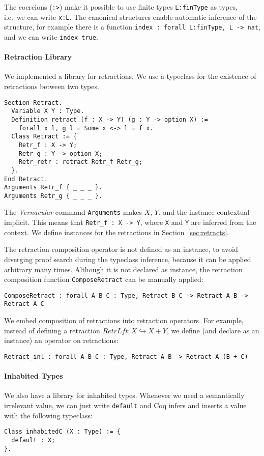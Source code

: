 The coercions (\lstinline!:>!) make it possible to use finite types \lstinline{L:finType} as types, i.e.\ we can write \lstinline!x:L!.  The canonical
structures enable automatic inference of the structure, for example there is a function \lstinline!index : forall L:finType, L -> nat!, and we can
write \lstinline!index true!.

\paragraph{Retraction Library}

We implemented a library for retractions.  We use a typeclass for the existence of retractions between two types.
\begin{lstlisting}
Section Retract.
  Variable X Y : Type.
  Definition retract (f : X -> Y) (g : Y -> option X) :=
    forall x l, g l = Some x <-> l = f x.
  Class Retract := {
    Retr_f : X -> Y;
    Retr_g : Y -> option X;
    Retr_retr : retract Retr_f Retr_g;
  }.
End Retract.
Arguments Retr_f { _ _ _ }.
Arguments Retr_g { _ _ _ }.
\end{lstlisting}
The \textit{Vernacular} command \lstinline!Arguments! makes $X$, $Y$, and the instance contextual implicit.  This means that
\lstinline!Retr_f : X -> Y!, where \lstinline!X! and \lstinline!Y! are inferred from the context.  We define instances for the retractions in
Section~\ref{sec:retracts}.

The retraction composition operator is not defined as an instance, to avoid diverging proof search during the typeclass inference, because it can be
applied arbitrary many times.  Although it is not declared as instance, the retraction composition function \lstinline!ComposeRetract! can be manually
applied:
\begin{lstlisting}
ComposeRetract : forall A B C : Type, Retract B C -> Retract A B -> Retract A C
\end{lstlisting}
We embed composition of retractions into retraction operators.  For example, instead of defining a retraction $RetrLft : X \hookrightarrow X+Y$, we
define (and declare as an instance) an operator on retractions:
\begin{lstlisting}
Retract_inl : forall A B C : Type, Retract A B -> Retract A (B + C)
\end{lstlisting}


\paragraph{Inhabited Types}
We also have a library for inhabited types.  Whenever we need a semantically irrelevant value, we can just write \lstinline!default! and Coq infers
and inserts a value with the following typeclass:
\begin{lstlisting}
Class inhabitedC (X : Type) := {
  default : X;
}.
\end{lstlisting}

